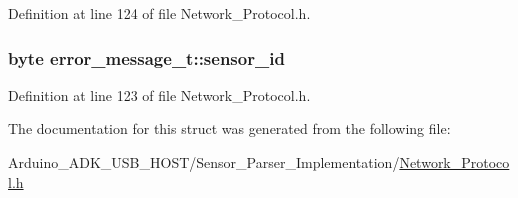Definition at line 124 of file Network\-\_\-\-Protocol.\-h.

\hypertarget{structerror__message__t_a7d9b99908db548242343009da13dc60f}{
\subsubsection[{sensor\-\_\-id}]{\setlength{\rightskip}{0pt plus 5cm}byte error\-\_\-message\-\_\-t\-::sensor\-\_\-id}}\label{structerror__message__t_a7d9b99908db548242343009da13dc60f}


Definition at line 123 of file Network\-\_\-\-Protocol.\-h.



The documentation for this struct was generated from the following file\-:\begin{DoxyCompactItemize}
\item 
Arduino\-\_\-\-A\-D\-K\-\_\-\-U\-S\-B\-\_\-\-H\-O\-S\-T/\-Sensor\-\_\-\-Parser\-\_\-\-Implementation/\hyperlink{_network___protocol_8h}{Network\-\_\-\-Protocol.\-h}\end{DoxyCompactItemize}
